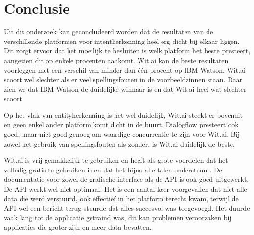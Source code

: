 
\chapter{Conclusie}
\label{ch:conclusie}




Uit dit onderzoek kan geconcludeerd worden dat de resultaten van de verschillende platformen voor intentherkenning heel erg dicht bij elkaar liggen. Dit zorgt ervoor dat het moeilijk te besluiten is welk platform het beste presteert, aangezien dit op enkele procenten aankomt. Wit.ai kan de beste resultaten voorleggen met een verschil van minder dan één procent op IBM Watson. Wit.ai scoort wel slechter als er veel spellingsfouten in de voorbeeldzinnen staan. Daar zien we dat IBM Watson de duidelijke winnaar is en dat Wit.ai heel wat slechter scoort.

Op het vlak van entityherkenning is het wel duidelijk, Wit.ai steekt er bovenuit en geen enkel ander platform komt dicht in de buurt. Dialogflow presteert ook goed, maar niet goed genoeg om waardige concurrentie te zijn voor Wit.ai. Bij zowel het gebruik van spellingsfouten als zonder, is Wit.ai duidelijk de beste.

Wit.ai is vrij gemakkelijk te gebruiken en heeft als grote voordelen dat het volledig gratis te gebruiken is en dat het bijna alle talen ondersteunt. De documentatie voor zowel de grafische interface als de API is ook goed uitgewerkt. De API werkt wel niet optimaal. Het is een aantal keer voorgevallen dat niet alle data die werd verstuurd, ook effectief in het platform terecht kwam, terwijl de API wel een bericht terug stuurde dat alles succesvol was toegevoegd. Het duurde vaak lang tot de applicatie getraind was, dit kan problemen veroorzaken bij applicaties die groter zijn en meer data bevatten.

